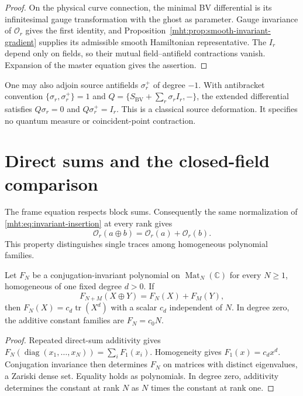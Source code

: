 \begin{proof}
On the physical curve connection, the minimal BV differential is its
infinitesimal gauge transformation with the ghost as parameter.
Gauge invariance of $\mathcal O_r$ gives the first identity, and
Proposition~\ref{mht:prop:smooth-invariant-gradient} supplies its
admissible smooth Hamiltonian representative. The $I_r$ depend only
on fields, so their mutual field--antifield contractions vanish.
Expansion of the master equation gives the assertion.
\end{proof}

One may also adjoin source antifields $\sigma_r^+$ of degree $-1$.
With antibracket convention $\{\sigma_r,\sigma_r^+\}=1$ and
$Q=\{S_{\mathrm{BV}}+\sum_r\sigma_rI_r,-\}$, the extended differential satisfies
$Q\sigma_r=0$ and $Q\sigma_r^+=I_r$.
This is a classical source deformation. It specifies no quantum
measure or coincident-point contraction.

\section{Direct sums and the closed-field comparison}

The frame equation respects block sums. Consequently the same
normalization of \eqref{mht:eq:invariant-insertion} at every rank gives
\[
 \mathcal O_r(a\oplus b)=\mathcal O_r(a)+\mathcal O_r(b).
\]
This property distinguishes single traces among homogeneous polynomial
families.

\begin{proposition}\label{mht:prop:additive-trace-family}
Let $F_N$ be a conjugation-invariant polynomial on
$\operatorname{Mat}_N(\mathbb C)$ for every $N\geq1$, homogeneous of one
fixed degree $d>0$. If
\[
 F_{N+M}(X\oplus Y)=F_N(X)+F_M(Y),
\]
then $F_N(X)=c_d\operatorname{tr}(X^d)$ with a scalar $c_d$ independent
of $N$. In degree zero, the additive constant families are $F_N=c_0N$.
\end{proposition}

\begin{proof}
Repeated direct-sum additivity gives
$F_N(\operatorname{diag}(x_1,\ldots,x_N))=\sum_iF_1(x_i)$.
Homogeneity gives $F_1(x)=c_dx^d$. Conjugation invariance then determines
$F_N$ on matrices with distinct eigenvalues, a Zariski dense set.
Equality holds as polynomials. In degree zero, additivity determines
the constant at rank $N$ as $N$ times the constant at rank one.
\end{proof}

